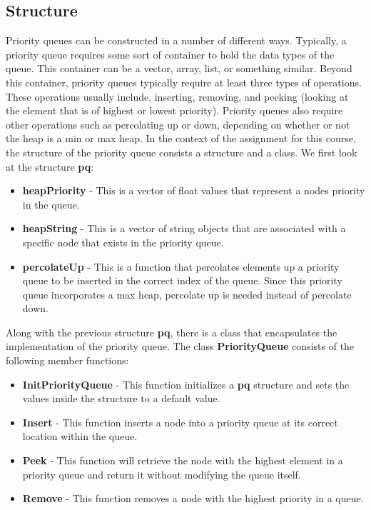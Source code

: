 \subsection*{Structure}

Priority queues can be constructed in a number of different ways. Typically, a priority queue requires some sort of container to hold the data types of the queue. This container can be a vector, array,
list, or something similar. Beyond this container, priority queues typically require at least three types of operations. These operations usually include, inserting, removing, and peeking (looking at
the element that is of highest or lowest priority). Priority queues also require other operations such as percolating up or down, depending on whether or not the heap is a min or max heap. In the context
of the assignment for this course, the structure of the priority queue consists a structure and a class. We first look at the structure \textbf{pq}:

\begin{itemize}
    \item \textbf{heapPriority} - This is a vector of float values that represent a nodes priority in the queue.
    \item \textbf{heapString} - This is a vector of string objects that are associated with a specific node that exists in the priority queue.
    \item \textbf{percolateUp} - This is a function that percolates elements up a priority queue to be inserted in the correct index of the queue. Since this priority queue incorporates a max
    heap, percolate up is needed instead of percolate down.
\end{itemize}

\noindent Along with the previous structure \textbf{pq}, there is a class that encapsulates the implementation of the priority queue. The class \textbf{PriorityQueue} consists of the following member 
functions:

\begin{itemize}
    \item \textbf{InitPriorityQueue} - This function initializes a \textbf{pq} structure and sets the values inside the structure to a default value.
    \item \textbf{Insert} - This function inserts a node into a priority queue at its correct location within the queue.
    \item \textbf{Peek} - This function will retrieve the node with the highest element in a priority queue and return it without modifying the queue itself.
    \item \textbf{Remove} - This function removes a node with the highest priority in a queue.
\end{itemize}

